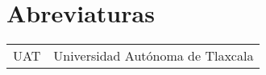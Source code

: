 \chapter*{Abreviaturas}

\begin{tabular}{ll}
  UAT & Universidad Aut\'onoma de Tlaxcala
\end{tabular}


